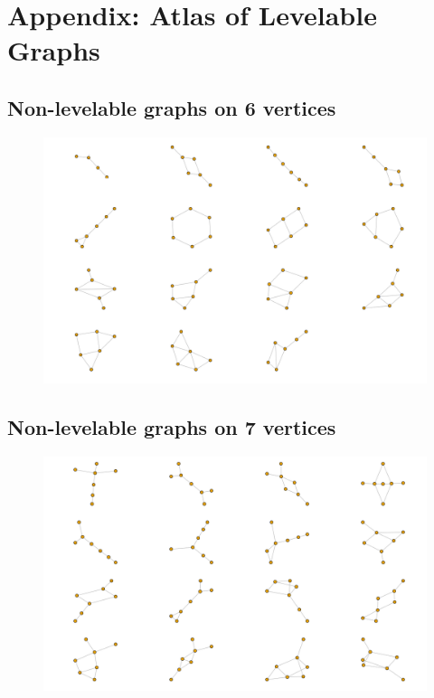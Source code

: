 
\chapter{Appendix: Atlas of Levelable Graphs} \label{appendix}

\section*{Non-levelable graphs on 6 vertices}

\begin{figure}[h!]
    {\includegraphics[width=1\linewidth]{atlas/atlas6.png}} 
\end{figure}

\section*{Non-levelable graphs on 7 vertices}
\vspace{-0.5cm}
\begin{figure}[h!]
    {\includegraphics[width=0.95\linewidth]{atlas/atlas7-1.png}} 
\end{figure}

